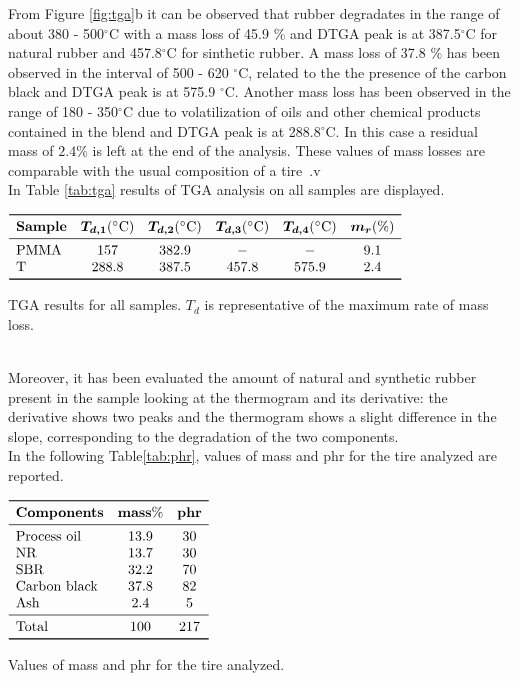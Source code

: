 \documentclass[a4paper, 11pt]{article}
\begin{document}
\newpage

From Figure \ref{fig:tga}b it can be observed that rubber degradates in the range of about 380 - 500$^\circ$C with a mass loss of 45.9 $\%$ and DTGA peak is at 387.5$^\circ$C for natural rubber and 457.8$^\circ$C for sinthetic rubber. A mass loss of 37.8 $\%$ has been observed in the interval of 500 - 620 $^\circ$C, related to the the presence of the carbon black and DTGA peak is at 575.9 $^\circ$C. Another mass loss has been observed in the range of 180 - 350$^\circ$C due to volatilization of oils and other chemical products contained in the blend and DTGA peak is at 288.8$^\circ$C. In this case a residual mass of $2.4\%$ is left at the end of the analysis. These values of mass losses are comparable with the usual composition of a tire~\cite{gommista}.v\\
In Table \ref{tab:tga} results of TGA analysis on all samples are displayed. 
\begin{table}[htp]
\centering
$
\begin{array}{lccccc}
\toprule
\textbf{Sample}  & \bm{T_{d,1}} (\SI{}{\celsius}) & \bm{T_{d,2}} (\SI{}{\celsius}) & \bm{T_{d,3}} (\SI{}{\celsius}) & \bm{T_{d,4}} (\SI{}{\celsius}) & \bm{m_{r}} (\si{\%}) \\
\midrule
\text{PMMA}  & 157 & 382.9 & - & - & 9.1  \\
\text{T}  & 288.8 & 387.5 & 457.8 & 575.9 & 2.4  \\
\bottomrule
\end{array}
$
\caption{TGA results for all samples. $T_d$ is representative of the maximum rate of mass loss.}
\label{tab:tga}
\end{table}\\
Moreover, it has been evaluated the amount of natural and synthetic rubber present in the sample looking at the thermogram and its derivative: the derivative shows two peaks and the thermogram shows a slight difference in the slope, corresponding to the degradation of the two components.\\
In the following Table\ref{tab:phr}, values of mass and phr for the tire analyzed are reported.

\begin{table}[htp]
\centering
$
\begin{array}{lcc}
\toprule
\textbf{Components} & \textbf{mass} \% & \textbf{phr} \\
\midrule
\text{Process oil} & 13.9 & 30 \\
\text{NR} & 13.7 &30\\
\text{SBR} & 32.2 &70 \\
\text{Carbon black} & 37.8 & 82 \\
\text{Ash}& 2.4 & 5\\
\midrule
\text {Total}& 100 & 217\\
\bottomrule
\end{array}
$
\caption{Values of mass and phr for the tire analyzed.}
\label{tab:phr}
\end{table}
\end{document}

